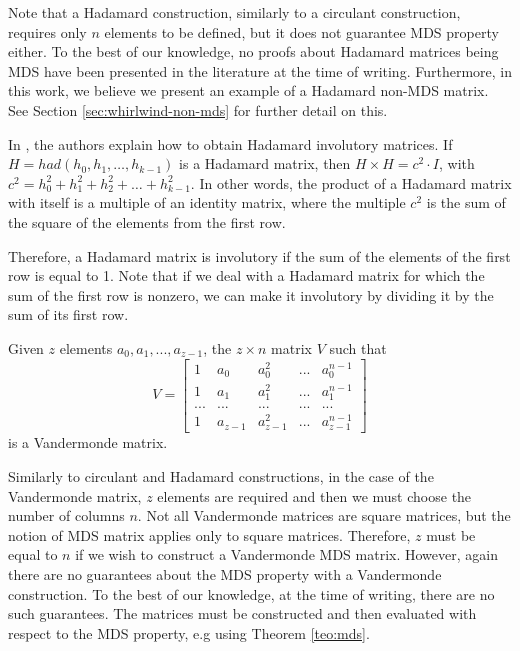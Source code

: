 Note that a Hadamard construction, similarly to a circulant construction, requires only $n$ elements to be defined, but it does not guarantee MDS property either. To the best of our knowledge, no proofs about Hadamard matrices being MDS have been presented in the literature at the time of writing. Furthermore, in this work, we believe we present an example of a Hadamard non-MDS matrix. See Section \ref{sec:whirlwind-non-mds} for further detail on this.

In \cite{LwInvolKhoo2015}, the authors explain how to obtain Hadamard involutory matrices. If $H = had(h_0, h_1, …, h_{k-1})$ is a Hadamard matrix, then $H \times H = c^2 \cdot I$, with $c^2 = h_0^2 + h_1^2 + h_2^2 + … + h_{k-1}^2$. In other words, the product of a Hadamard matrix with itself is a multiple of an identity matrix, where the multiple $c^2$ is the sum of the square of the elements from the first row.

Therefore, a Hadamard matrix is involutory if the sum of the elements of the first row is equal to 1. Note that if we deal with a Hadamard matrix for which the sum of the first row is nonzero, we can make it involutory by dividing it by the sum of its first row.

\begin{definition}
Given $z$ elements $a_0, a_1, ..., a_{z-1}$, the $z \times n$ matrix $V$ such that
\begin{equation}\label{eq:cost}
V =
\begin{bmatrix}
1 & a_0 & a_0^2 & ... & a_0^{n-1}\\
1 & a_1 & a_1^2 & ... & a_1^{n-1}\\
... & ... & ... & ... & ...\\
1 & a_{z-1} & a_{z-1}^2 & ... & a_{z-1}^{n-1}
\end{bmatrix}
\end{equation}
is a Vandermonde matrix.
\end{definition}

Similarly to circulant and Hadamard constructions, in the case of the Vandermonde matrix, $z$ elements are required and then we must choose the number of columns $n$. Not all Vandermonde matrices are square matrices, but the notion of MDS matrix applies only to square matrices. Therefore, $z$ must be equal to $n$ if we wish to construct a Vandermonde MDS matrix. However, again there are no guarantees about the MDS property with a Vandermonde construction. To the best of our knowledge, at the time of writing, there are no such guarantees. The matrices must be constructed and then evaluated with respect to the MDS property, e.g using Theorem \ref{teo:mds}.

